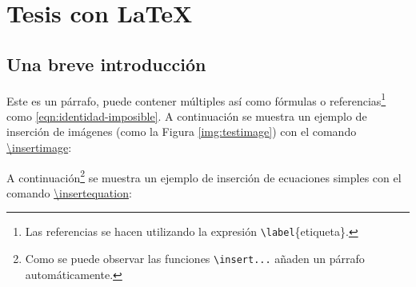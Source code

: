 \section{Tesis con \LaTeX}

\lipsum[4]

\subsection{Una breve introducción}
	
	Este es un párrafo, puede contener múltiples  así como fórmulas o referencias\footnote{Las referencias se hacen utilizando la expresión \texttt{\textbackslash label}\{etiqueta\}.} como \eqref{eqn:identidad-imposible}. A continuación se muestra un ejemplo de inserción de imágenes (como la Figura \ref{img:testimage}) con el comando \href{https://latex.ppizarror.com/informe.html#hlp-imagen}{\textbackslash insertimage}:

		

	A continuación\footnote{Como se puede observar las funciones \texttt{\textbackslash insert...} añaden un párrafo automáticamente.} se muestra un ejemplo de inserción de ecuaciones simples con el comando \href{https://latex.ppizarror.com/informe.html#hlp-formulae}{\textbackslash insertequation}:

